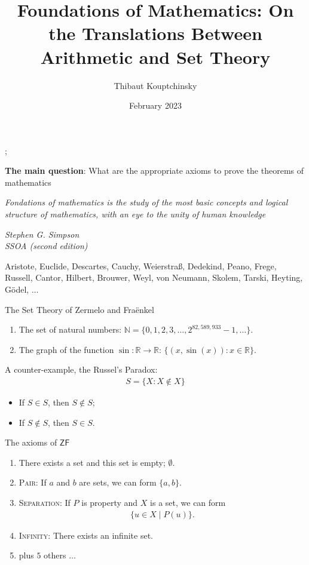 \documentclass{beamer} %
\title[Arithmetic and Set Theory]{Foundations of Mathematics: On the Translations Between 
Arithmetic and Set Theory}
\institute[COLABS]{COLABS Tohoku University \and UCLouvain}
\author{Thibaut Kouptchinsky}
\date{February 2023}
\begin{document}
\begin{frame}
	\titlepage;
\end{frame}

\begin{frame}{\textbf{The main question}: What are the appropriate axioms to prove the theorems of mathematics }

        \epigraph{\textit{Fondations of mathematics is the study of the most basic concepts 
        and logical structure of mathematics, with an eye to the unity of human knowledge}}{\textit{Stephen G. Simpson \\ SSOA (second edition)}}
\pause Aristote, Euclide, Descartes, Cauchy, Weierstraß, Dedekind, Peano, Frege, Russell, 
Cantor, Hilbert, Brouwer, Weyl, von Neumann, Skolem, Tarski, Heyting, Gödel, $\dots$
\end{frame}

\begin{frame}{The Set Theory of Zermelo and Fraënkel}
    \begin{example}
         \begin{enumerate}
            \item<1-> The set of natural numbers: $\mathbb{N} = \{0, 1, 2, 3, \dots, 2^{82,589,933}-1, \dots \}$.
            \item<2-> The graph of the function $\sin \colon \mathbb{R} \to \mathbb{R}$: $\{(x,\sin(x)) : x \in \mathbb{R}\}$.
        \end{enumerate}
    \end{example}
    \pause 
    \pause 
    A counter-example, the Russel's Paradox: \begin{align*}
        S = \{ X : X \not\in X\}
    \end{align*}
    \begin{itemize}
        \item<5-> If $S \in S$, then $S \not\in S$;
        \item<6-> If $S \not\in S$, then $S \in S$. 
    \end{itemize}
\end{frame}

\begin{frame}{The axioms of $\mathsf{ZF}$}
    \begin{enumerate}
        \item<1-> There exists a set and this set is empty; $\emptyset$.
        \item<2-> \textsc{Pair}: If $a$ and $b$ are sets, we can form $\{a,b\}$.
        \item<3-> \textsc{Separation}: If $P$ is property and $X$ is a set, we can form \begin{align*}
            \{u \in X \mid P(u)\}.    
        \end{align*}
        \item<4-> \textsc{Infinity}: There exists an infinite set.
        \item<5-> plus $5$ others $\dots$ 
    \end{enumerate}
\end{frame}
\end{document}
